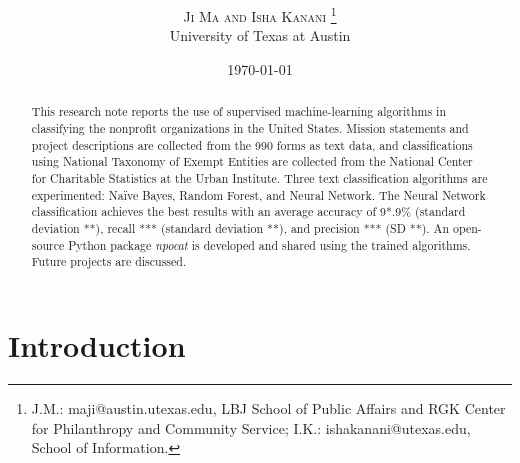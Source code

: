 \documentclass[12pt]{article}
\title{\textbf{\capitalisewords{Classification of nonprofit organizations: A supervised machine-learning approach}}}
\author{%
\textsc{Ji Ma and Isha Kanani} \thanks{J.M.: maji@austin.utexas.edu, LBJ School of Public Affairs and RGK Center for Philanthropy and Community Service; I.K.: ishakanani@utexas.edu, School of Information.} \\[1ex] %
\normalsize University of Texas at Austin \\ %
}
\date{\today} %
\begin{document}
\maketitle

\begin{abstract}
\noindent This research note reports the use of supervised machine-learning algorithms in classifying the nonprofit organizations in the United States. Mission statements and project descriptions are collected from the 990 forms as text data, and classifications using National Taxonomy of Exempt Entities are collected from the National Center for Charitable Statistics at the Urban Institute. Three text classification algorithms are experimented: Na\"ive Bayes, Random Forest, and Neural Network. The Neural Network classification achieves the best results with an average accuracy of 9*.9\% (standard deviation **), recall *** (standard deviation **), and precision *** (SD **). An open-source Python package \textit{npocat} is developed and shared using the trained algorithms. Future projects are discussed.

\end{abstract}
\clearpage

\listoftodos
\clearpage

\section{Introduction}
\end{document}

